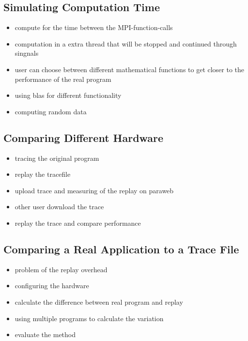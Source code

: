 \subsection{Simulating Computation Time} 

\begin{itemize}
  \item compute for the time between the MPI-function-calls
  \item computation in a extra thread that will be stopped and continued
    through singnals
  \item user can choose between different mathematical functions to get closer 
  to the performance of the real program
  \item using blas for different functionality
  \item computing random data
\end{itemize}

\subsection{Comparing Different Hardware}
\begin{itemize}
  \item tracing the original program
  \item replay the tracefile
  \item upload trace and measuring of the replay on paraweb
  \item other user download the trace 
  \item replay the trace and compare performance 
\end{itemize}

\subsection{Comparing a Real Application to a Trace File}

\begin{itemize}
  \item problem of the replay overhead
  \item configuring the hardware
  \item calculate the difference between real program and replay 
  \item using multiple programs to calculate the variation
  \item evaluate the method 
\end{itemize}

